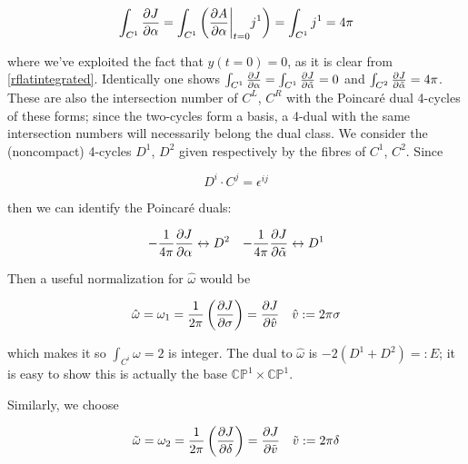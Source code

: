 \begin{equation}
	\int_{C^1} \frac{\partial J}{\partial\alpha} = \int_{C^1}\left( \frac{\partial A}{\partial\alpha}\bigg|_{t=0} j^1 \right) = \int_{C^1} j^1 = 4\pi
	\label{}
\end{equation}

where we've exploited the fact that $y(t=0) = 0$, as it is clear from \eqref{rflatintegrated}. Identically one shows $\int_{C^1} \frac{\partial J}{\partial\alpha} = \int_{C^1} \frac{\partial J}{\partial\tilde\alpha} = 0$ and $\int_{C^2} \frac{\partial J}{\partial\tilde\alpha} = 4\pi$. These are also the intersection number of $C^L$, $C^R$ with the Poincar\'e dual 4-cycles of these forms; since the two-cycles form a basis, a 4-dual with the same intersection numbers will necessarily belong the dual class. We consider the (noncompact) 4-cycles $D^1$, $D^2$ given respectively by the fibres of $C^1$, $C^2$. Since

\begin{equation}
	D^i \cdot C^j = \epsilon^{ij}	
\end{equation}

then we can identify the Poincar\'e duals:

\begin{align}
	- \frac{1}{4\pi} \frac{\partial J}{\partial\alpha} \leftrightarrow D^2 && - \frac{1}{4\pi}\frac{\partial J}{\partial\tilde\alpha} \leftrightarrow D^1
	\label{}
\end{align}

Then a useful normalization for $\hat\omega$ would be

\begin{align}
	\hat\omega = \omega_1 = \frac{1}{2\pi}\left( \frac{\partial J}{\partial\sigma} \right) = \frac{\partial J}{\partial\hat v} && \hat v := 2\pi \sigma
	\label{}
\end{align}

which makes it so $\int_{C^i} \omega = 2$ is integer. The dual to $\hat \omega $ is $-2(D^1+D^2) =: E$; it is easy to show this is actually the base $\mathbb{CP}^1 \times \mathbb{CP}^1$.
%
%
%

Similarly, we choose

\begin{align}
	\tilde \omega = \omega_2 = \frac{1}{2\pi} \left( \frac{\partial J}{\partial\delta} \right) = \frac{\partial J}{\partial\tilde v} && \tilde v := 2\pi\delta
	\label{}
\end{align}

